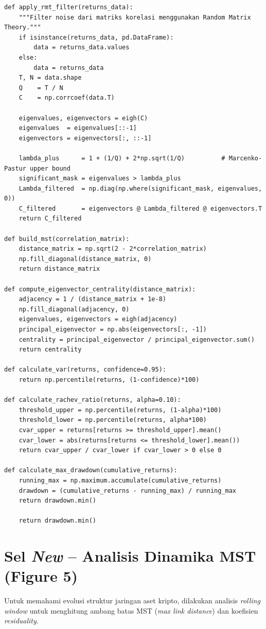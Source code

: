 \documentclass[12pt,a4paper]{article}
\begin{document}
\begin{lstlisting}[caption={Algoritma Network dan Metrik Risiko}]
def apply_rmt_filter(returns_data):
    """Filter noise dari matriks korelasi menggunakan Random Matrix Theory."""
    if isinstance(returns_data, pd.DataFrame):
        data = returns_data.values
    else:
        data = returns_data
    T, N = data.shape
    Q    = T / N
    C    = np.corrcoef(data.T)

    eigenvalues, eigenvectors = eigh(C)
    eigenvalues  = eigenvalues[::-1]
    eigenvectors = eigenvectors[:, ::-1]

    lambda_plus      = 1 + (1/Q) + 2*np.sqrt(1/Q)          # Marcenko-Pastur upper bound
    significant_mask = eigenvalues > lambda_plus
    Lambda_filtered  = np.diag(np.where(significant_mask, eigenvalues, 0))
    C_filtered       = eigenvectors @ Lambda_filtered @ eigenvectors.T
    return C_filtered

def build_mst(correlation_matrix):
    distance_matrix = np.sqrt(2 - 2*correlation_matrix)
    np.fill_diagonal(distance_matrix, 0)
    return distance_matrix

def compute_eigenvector_centrality(distance_matrix):
    adjacency = 1 / (distance_matrix + 1e-8)
    np.fill_diagonal(adjacency, 0)
    eigenvalues, eigenvectors = eigh(adjacency)
    principal_eigenvector = np.abs(eigenvectors[:, -1])
    centrality = principal_eigenvector / principal_eigenvector.sum()
    return centrality

def calculate_var(returns, confidence=0.95):
    return np.percentile(returns, (1-confidence)*100)

def calculate_rachev_ratio(returns, alpha=0.10):
    threshold_upper = np.percentile(returns, (1-alpha)*100)
    threshold_lower = np.percentile(returns, alpha*100)
    cvar_upper = returns[returns >= threshold_upper].mean()
    cvar_lower = abs(returns[returns <= threshold_lower].mean())
    return cvar_upper / cvar_lower if cvar_lower > 0 else 0

def calculate_max_drawdown(cumulative_returns):
    running_max = np.maximum.accumulate(cumulative_returns)
    drawdown = (cumulative_returns - running_max) / running_max
    return drawdown.min()

    return drawdown.min()
\end{lstlisting}

\section{Sel \textit{New} -- Analisis Dinamika MST (Figure 5)}
Untuk memahami evolusi struktur jaringan aset kripto, dilakukan analisis \textit{rolling window} untuk menghitung ambang batas MST (\textit{max link distance}) dan koefisien \textit{residuality}.
\end{document}
